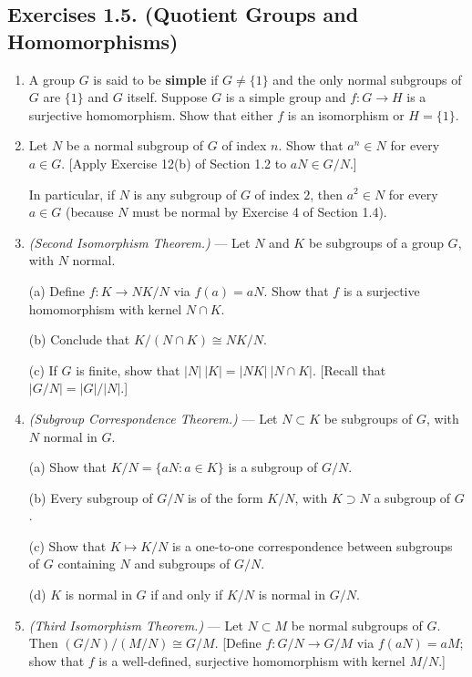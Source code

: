 \documentclass[leqno]{book}
\begin{document}
\subsection*{Exercises 1.5. (Quotient Groups and Homomorphisms)}
\begin{enumerate}
\item A group $G$ is said to be \textbf{simple} if $G\ne\{1\}$ and the only normal subgroups of $G$ are $\{1\}$ and $G$ itself.  Suppose $G$ is a simple group and $f:G\to H$ is a surjective homomorphism.  Show that either $f$ is an isomorphism or $H=\{1\}$.

\item Let $N$ be a normal subgroup of $G$ of index $n$.  Show that $a^n\in N$ for every $a\in G$.  [Apply Exercise 12(b) of Section 1.2 to $aN\in G/N$.]

In particular, if $N$ is any subgroup of $G$ of index $2$, then $a^2\in N$ for every $a\in G$ (because $N$ must be normal by Exercise 4 of Section 1.4).

\item\emph{(Second Isomorphism Theorem.)} \---- Let $N$ and $K$ be subgroups of a group $G$, with $N$ normal.

(a) Define $f:K\to NK/N$ via $f(a)=aN$.  Show that $f$ is a surjective homomorphism with kernel $N\cap K$.

(b) Conclude that $K/(N\cap K)\cong NK/N$.

(c) If $G$ is finite, show that $|N|~|K|=|NK|~|N\cap K|$.  [Recall that $|G/N|=|G|/|N|$.]

\item\emph{(Subgroup Correspondence Theorem.)} \---- Let $N\subset K$ be subgroups of $G$, with $N$ normal in $G$.

(a) Show that $K/N=\{aN:a\in K\}$ is a subgroup of $G/N$.

(b) Every subgroup of $G/N$ is of the form $K/N$, with $K\supset N$ a subgroup of $G$.

(c) Show that $K\mapsto K/N$ is a one-to-one correspondence between subgroups of $G$ containing $N$ and subgroups of $G/N$.

(d) $K$ is normal in $G$ if and only if $K/N$ is normal in $G/N$.

\item\emph{(Third Isomorphism Theorem.)} \---- Let $N\subset M$ be normal subgroups of $G$.  Then $(G/N)/(M/N)\cong G/M$.  [Define $f:G/N\to G/M$ via $f(aN)=aM$; show that $f$ is a well-defined, surjective homomorphism with kernel $M/N$.]


\end{enumerate}
\end{document}
